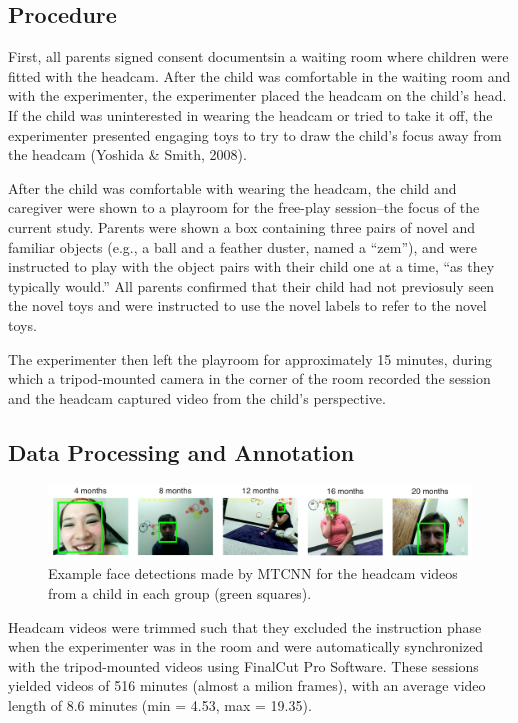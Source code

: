 \documentclass[10pt, letterpaper]{article}
\begin{document}
\subsection{Procedure}\label{procedure}

First, all parents signed consent documentsin a waiting room where
children were fitted with the headcam. After the child was comfortable
in the waiting room and with the experimenter, the experimenter placed
the headcam on the child's head. If the child was uninterested in
wearing the headcam or tried to take it off, the experimenter presented
engaging toys to try to draw the child's focus away from the headcam
(Yoshida \& Smith, 2008).

After the child was comfortable with wearing the headcam, the child and
caregiver were shown to a playroom for the free-play session--the focus
of the current study. Parents were shown a box containing three pairs of
novel and familiar objects (e.g., a ball and a feather duster, named a
``zem''), and were instructed to play with the object pairs with their
child one at a time, ``as they typically would.'' All parents confirmed
that their child had not previosuly seen the novel toys and were
instructed to use the novel labels to refer to the novel toys.

The experimenter then left the playroom for approximately 15 minutes,
during which a tripod-mounted camera in the corner of the room recorded
the session and the headcam captured video from the child's perspective.

\subsection{Data Processing and
Annotation}\label{data-processing-and-annotation}

\begin{figure}
\includegraphics[width=6in]{images/framesample.pdf}
\caption{\label{fig:frames} Example face detections made by MTCNN for the headcam videos from a child in each group  (green squares).}
\end{figure}

Headcam videos were trimmed such that they excluded the instruction
phase when the experimenter was in the room and were automatically
synchronized with the tripod-mounted videos using FinalCut Pro Software.
These sessions yielded videos of 516 minutes (almost a milion frames),
with an average video length of 8.6 minutes (min = 4.53, max = 19.35).
\end{document}
